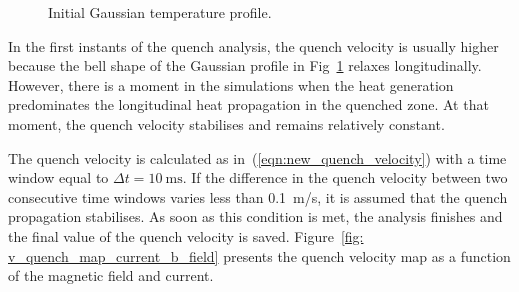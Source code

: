 \begin{figure}[H]
\centering
    \caption{Initial Gaussian temperature profile.}
    \label{fig: init_gauss_temp_distr_quench_velocity}
\end{figure}

In the first instants of the quench analysis, the quench velocity is usually higher because the bell shape of the Gaussian profile in Fig~\ref{fig: init_gauss_temp_distr_quench_velocity} relaxes longitudinally. However, there is a moment in the simulations when the heat generation predominates the longitudinal heat propagation in the quenched zone. At that moment, the quench velocity stabilises and remains relatively constant. 

The quench velocity is calculated as in~(\ref{eqn:new_quench_velocity}) with a time window equal to $\Delta t=10~\text{ms}$. If the difference in the quench velocity between two consecutive time windows varies less than 0.1~m/s, it is assumed that the quench propagation stabilises. As soon as this condition is met, the analysis finishes and the final value of the quench velocity is saved. Figure~\ref{fig: v_quench_map_current_b_field} presents the quench velocity map as a function of the magnetic field and current.

